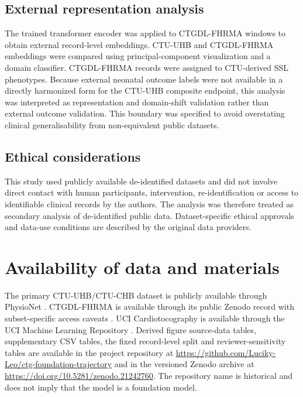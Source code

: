 \documentclass[pdflatex,sn-nature]{sn-jnl}
\begin{document}
\subsection{External representation analysis}

The trained transformer encoder was applied to CTGDL-FHRMA windows to obtain external record-level embeddings. CTU-UHB and CTGDL-FHRMA embeddings were compared using principal-component visualization and a domain classifier. CTGDL-FHRMA records were assigned to CTU-derived SSL phenotypes. Because external neonatal outcome labels were not available in a directly harmonized form for the CTU-UHB composite endpoint, this analysis was interpreted as representation and domain-shift validation rather than external outcome validation. This boundary was specified to avoid overstating clinical generalisability from non-equivalent public datasets.

\subsection{Ethical considerations}

This study used publicly available de-identified datasets and did not involve direct contact with human participants, intervention, re-identification or access to identifiable clinical records by the authors. The analysis was therefore treated as secondary analysis of de-identified public data. Dataset-specific ethical approvals and data-use conditions are described by the original data providers.

\section{Availability of data and materials}

The primary CTU-UHB/CTU-CHB dataset is publicly available through PhysioNet \cite{goldberger2000,chudacek2014,ctuuhb}. CTGDL-FHRMA is available through its public Zenodo record with subset-specific access caveats \cite{ctgdl}. UCI Cardiotocography is available through the UCI Machine Learning Repository \cite{uci}. Derived figure source-data tables, supplementary CSV tables, the fixed record-level split and reviewer-sensitivity tables are available in the project repository at \url{https://github.com/Luciky-Leo/ctg-foundation-trajectory} and in the versioned Zenodo archive at \url{https://doi.org/10.5281/zenodo.21242760}. The repository name is historical and does not imply that the model is a foundation model.
\end{document}
